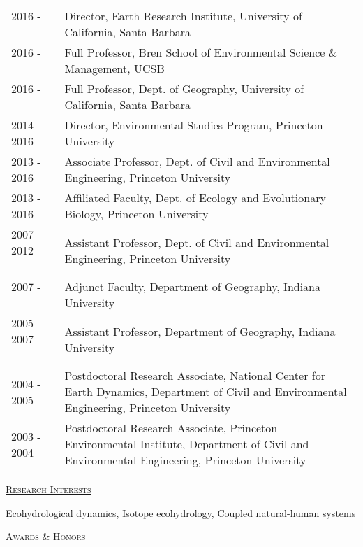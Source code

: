 \documentclass[10pt]{report}
\begin{document}
\begin{tabular}{l p{5.5in} }
2016 - \ \ \ \ & Director, Earth Research Institute, University of California, Santa Barbara \\ 
2016 - \ \ \ \ & Full Professor, Bren School of Environmental Science \& Management, UCSB \\ 
2016 - \ \ \ \ & Full Professor, Dept. of Geography, University of California, Santa Barbara \\ 
2014 - 2016 & Director, Environmental Studies Program, Princeton University \\
2013 - 2016 & Associate Professor, Dept. of Civil and Environmental Engineering, Princeton University \\
2013 - 2016 & Affiliated Faculty, Dept. of Ecology and Evolutionary Biology, Princeton University \\
2007 - 2012 \ \ \ \ & Assistant Professor, Dept. of Civil and Environmental Engineering, Princeton University \\
2007 - \ \ \ \ & Adjunct Faculty, Department of Geography, Indiana University \\ 
2005 - 2007 \ \ \ \  & Assistant Professor, Department of Geography, Indiana University \\
2004 - 2005 & Postdoctoral Research Associate, National Center for Earth Dynamics, Department of Civil and \mbox{Environmental} Engineering, Princeton University  \\
2003 - 2004 & Postdoctoral Research Associate, Princeton Environmental Institute, Department of Civil and \mbox{Environmental} Engineering, Princeton University  \\
\end{tabular}

\vspace*{.1in}
\textsc{\underline{Research Interests}}
\vspace*{.1in}

Ecohydrological dynamics, Isotope ecohydrology, Coupled natural-human systems

\vspace*{.1in}
\textsc{\underline{Awards \& Honors}}
\vspace*{.1in}
\end{document}
